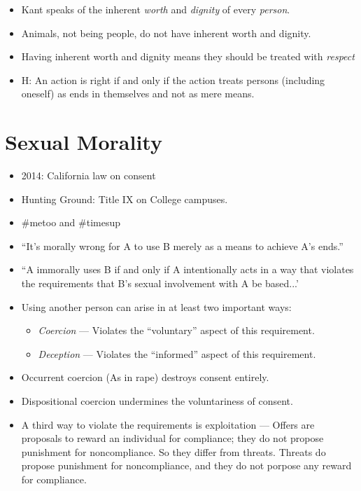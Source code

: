 \documentclass{article}
\begin{document}
\begin{spacing}{1.2}
    \newpage
    \begin{itemize}
        \item Kant speaks of the inherent \emph{worth} and \emph{dignity} of every \emph{person}.
        \item Animals, not being people, do not have inherent worth and dignity.
        \item Having inherent worth and dignity means they should be treated with \emph{respect}
        \item H: An action is right if and only if the action treats persons (including oneself) as ends in themselves and not as mere means.
    \end{itemize}

    \section{Sexual Morality}

    \begin{itemize}
        \item 2014: California law on consent
        \item Hunting Ground: Title IX on College campuses.
        \item \#metoo and \#timesup
        \item ``It's morally wrong for A to use B merely as a means to achieve A's ends.''
        \item ``A immorally uses B if and only if A intentionally acts in a way that violates the requirements that B's sexual involvement with A be based...'
        \item Using another person can arise in at least two important ways:
        \begin{itemize}
            \item \emph{Coercion} --- Violates the ``voluntary'' aspect of this requirement.
            \item \emph{Deception} --- Violates the ``informed'' aspect of this requirement.
        \end{itemize}
        \item Occurrent coercion (As in rape) destroys consent entirely.
        \item Dispositional coercion undermines the voluntariness of consent.
        \item A third way to violate the requirements is exploitation --- Offers are proposals to reward an individual for compliance; they do not propose punishment for noncompliance. So they differ from threats. Threats do propose punishment for noncompliance, and they do not porpose any reward for compliance.

    \end{itemize} 
\end{spacing}
\end{document}

